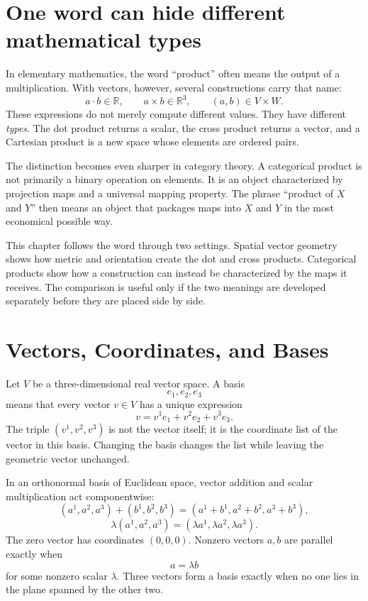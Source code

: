 
\section{One word can hide different mathematical types}

In elementary mathematics, the word ``product'' often means the output of a multiplication.  With vectors, however, several constructions carry that name:
\[
  a\cdot b\in\mathbb R,
  \qquad
  a\times b\in\mathbb R^3,
  \qquad
  (a,b)\in V\times W.
\]
These expressions do not merely compute different values.  They have different \emph{types}.  The dot product returns a scalar, the cross product returns a vector, and a Cartesian product is a new space whose elements are ordered pairs.

The distinction becomes even sharper in category theory.  A categorical product is not primarily a binary operation on elements.  It is an object characterized by projection maps and a universal mapping property.  The phrase ``product of \(X\) and \(Y\)'' then means an object that packages maps into \(X\) and \(Y\) in the most economical possible way.

This chapter follows the word through two settings.  Spatial vector geometry shows how metric and orientation create the dot and cross products.  Categorical products show how a construction can instead be characterized by the maps it receives.  The comparison is useful only if the two meanings are developed separately before they are placed side by side.

\section{Vectors, Coordinates, and Bases}

Let \(V\) be a three-dimensional real vector space.  A basis
\[
  e_1,e_2,e_3
\]
means that every vector \(v\in V\) has a unique expression
\[
  v=v^1e_1+v^2e_2+v^3e_3.
\]
The triple \((v^1,v^2,v^3)\) is not the vector itself; it is the coordinate list of the vector in this basis.  Changing the basis changes the list while leaving the geometric vector unchanged.

In an orthonormal basis of Euclidean space, vector addition and scalar multiplication act componentwise:
\[
  (a^1,a^2,a^3)+(b^1,b^2,b^3)
  =(a^1+b^1,a^2+b^2,a^3+b^3),
\]
\[
  \lambda(a^1,a^2,a^3)
  =(\lambda a^1,\lambda a^2,\lambda a^3).
\]
The zero vector has coordinates \((0,0,0)\).  Nonzero vectors \(a,b\) are parallel exactly when
\[
  a=\lambda b
\]
for some nonzero scalar \(\lambda\).  Three vectors form a basis exactly when no one lies in the plane spanned by the other two.


